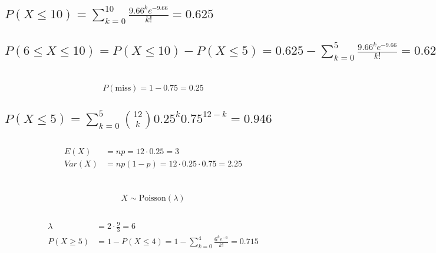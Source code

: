 \documentclass{homework}
\begin{document}
\subsection{$P(X \leq 10) = \sum_{k=0}^{10} \frac{9.66^{k} e^{-9.66}}{k!} = 0.625$}

\subsection{$P(6 \leq X \leq 10) = P(X \leq 10) - P(X \leq 5) = 0.625 - \sum_{k=0}^{5} \frac{9.66^{k} e^{-9.66}}{k!} = 0.625 - 0.081= 0.544$}

\section{}

\[P(\text{miss})=1 - 0.75 = 0.25\]

\subsection{$P(X \leq 5) = \sum_{k=0}^{5} \binom{12}{k} 0.25^k 0.75^{12-k} = 0.946$}

\subsection{}

\begin{align*}
E(X) &= np = 12 \cdot 0.25 = 3 \\
Var(X) &= np(1-p) = 12 \cdot 0.25 \cdot 0.75 = 2.25
\end{align*}

\section{}

\[
X \sim \text{Poisson}(\lambda)
\]

\subsection{}

\begin{align*}
    \lambda &= 2 \cdot \frac{9}{3} = 6 \\
    P(X \geq 5) &= 1 - P(X \leq 4) = 1 - \sum_{k=0}^4 \frac{6^k e^{-6}}{k!} = 0.715
\end{align*}

\subsection{}
\end{document}
